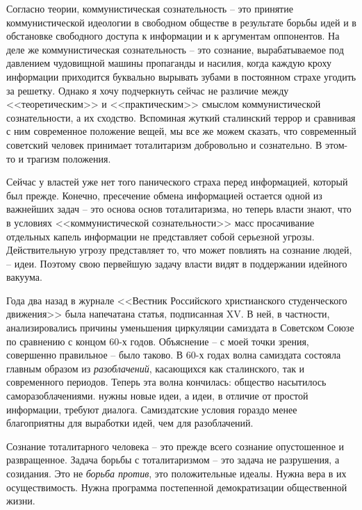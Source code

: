 \documentclass{book}
\begin{document}
Согласно теории, коммунистическая сознательность -- это принятие коммунистической идеологии в свободном обществе в результате борьбы идей и в обстановке свободного доступа к информации и к аргументам оппонентов. На деле же коммунистическая сознательность -- это сознание, вырабатываемое под давлением чудовищной машины пропаганды и насилия, когда каждую кроху информации приходится буквально вырывать зубами в постоянном страхе угодить за решетку. Однако я хочу подчеркнуть сейчас не различие между <<теоретическим>> и <<практическим>> смыслом коммунистической сознательности, а их сходство. Вспоминая жуткий сталинский террор и сравни­вая с ним современное положение вещей, мы все же можем сказать, что современный советский человек принимает тоталитаризм добровольно и сознательно. В этом-то и трагизм положения.

Сейчас у властей уже нет того панического страха перед информацией, который был прежде. Конечно, пресечение обме­на информацией остается одной из важнейших задач -- это основа основ тоталитаризма, но теперь власти знают, что в условиях <<коммунистической сознательности>> масс просачивание отдельных капель информации не представляет собой серьезной угрозы. Действительную угрозу представляет то, что может повлиять на сознание людей, -- идеи. Поэтому свою первейшую задачу власти видят в поддержании идейного вакуума.

Года два назад в журнале <<Вестник Российского христианского студенческого движения>> была напечатана статья, подписанная XV. В ней, в частности, анализировались причины уменьшения циркуляции самиздата в Советском Союзе по сравнению с концом 60-х годов. Объяснение -- с моей точки зрения, совершенно правильное -- было таково. В 60-х годах волна самиздата состояла главным образом из \textit{разоблачений},  касающихся как сталинского, так и современного периодов. Теперь эта волна кончилась: общество насытилось саморазоблачениями. нужны новые идеи, а идеи, в отличие от простой информации, требуют диалога. Самиздатские условия гораздо менее благоприятны для выработки идей, чем для разоблачений.

Сознание тоталитарного человека -- это прежде всего сознание опустошенное и развращенное. Задача борьбы с тоталитаризмом -- это задача не разрушения, а созидания. Это не \textit{борьба против},  это положительные идеалы. Нужна вера в их осуществимость. Нужна программа постепенной демократизации общественной жизни.
\end{document}
